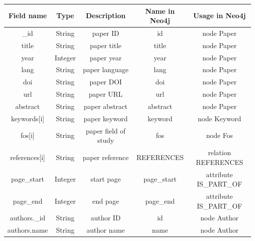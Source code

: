 \begin{table}[H]
    \centering
    \begin{tabular}{| c | c | c | c | c |}
        \hline
        \textbf{Field name} & \textbf{Type} & \textbf{Description} & \textbf{Name in Neo4j} & \textbf{Usage in Neo4j}  \T\B \\
        \hline
        \hline
        \_id                & String        & paper ID             & id                     & node Paper\T\B              \\
        title               & String        & paper title          & title                  & node Paper\T\B              \\
        year                & Integer       & paper year           & year                   & node Paper\T\B              \\
        lang                & String        & paper language       & lang                   & node Paper\T\B              \\
        doi                 & String        & paper DOI            & doi                    & node Paper\T\B              \\
        url                 & String        & paper URL            & url                    & node Paper\T\B              \\
        abstract            & String        & paper abstract       & abstract               & node Paper \T\B             \\
        keywords[i]         & String        & paper keyword        & keyword                & node Keyword\T\B            \\
        fos[i]              & String        & paper field of study & fos                    & node Fos\T\B                \\
        references[i]       & String        & paper reference      & REFERENCES             & relation REFERENCES\T\B     \\
        page\_start         & Integer       & start page           & page\_start            & attribute IS\_PART\_OF \T\B \\
        page\_end           & Integer       & end page             & page\_end              & attribute IS\_PART\_OF \T\B \\
        authors.\_id        & String        & author ID            & id                     & node Author\T\B             \\
        authors.name        & String        & author name          & name                   & node Author\T\B             \\

\end{tabular}
\end{table}
